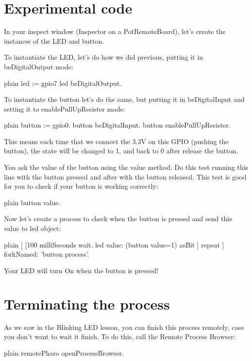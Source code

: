 \documentclass[10pt,twoside,english]{_support/latex/sbabook/sbabook}
\begin{document}
\section{Experimental code}
In your inspect window (Inspector on a PotRemoteBoard), let’s create the instances of the LED and button.

To instantiate the LED, let’s do how we did previous, putting it in beDigitalOutput mode:

\begin{displaycode}{plain}
led := gpio7
led beDigitalOutput.
\end{displaycode}

To instantiate the button let’s do the same, but putting it in beDigitalInput and setting it to enablePullUpResister mode:

\begin{displaycode}{plain}
button := gpio0.
button beDigitalInput.
button enablePullUpResister.
\end{displaycode}

This means each time that we connect the 3.3V on this GPIO (pushing the button), the state will be changed to 1, and back to 0 after release the button.

You ask the value of the button using the value method. Do this test running this line with the button pressed and after with the button released. This test is good for you to check if your button is working correctly:

\begin{displaycode}{plain}
button value.
\end{displaycode}

Now let’s create a process to check when the button is pressed and send this value to led object:

\begin{displaycode}{plain}
[ [100 milliSeconds wait. 
	led value: (button value=1) asBit
		] repeat	
	 ] forkNamed: 'button process'.
\end{displaycode}

Your LED will turn On when the button is pressed!
\section{Terminating the process}
As we saw in the Blinking LED lesson, you can finish this process remotely, case you don’t want to wait it finish. To do this, call the Remote Process Browser:

\begin{displaycode}{plain}
 remotePharo openProcessBrowser.
\end{displaycode}
\end{document}
